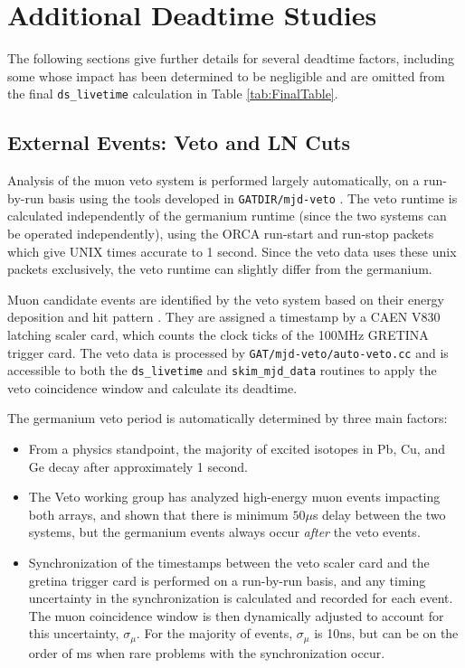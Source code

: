 \documentclass[notitlepage,rmp,aps,10pt]{revtex4-1}
\newcommand{\tty}{\texttt}
\begin{document}
\newpage
\section{Additional Deadtime Studies} \label{sec:deadtimeDetails}
The following sections give further details for several deadtime factors, including some whose impact has been determined to be negligible and are omitted from the final \tty{ds\_livetime} calculation in Table \ref{tab:FinalTable}.


\subsection{External Events: Veto and LN Cuts} \label{sec:externalEvents}

Analysis of the muon veto system is performed largely automatically, on a run-by-run basis using the tools developed in \tty{GATDIR/mjd-veto} \cite{Wiseman2015}.  The veto runtime is calculated independently of the germanium runtime (since the two systems can be operated independently), using the ORCA run-start and run-stop packets which give UNIX times accurate to 1 second.  Since the veto data uses these unix packets exclusively, the veto runtime can slightly differ from the germanium.

Muon candidate events are identified by the veto system based on their energy deposition and hit pattern \cite{Wiseman2015}.  They are assigned a timestamp by a CAEN V830 latching scaler card, which counts the clock ticks of the 100MHz GRETINA trigger card.  The veto data is processed by \tty{GAT/mjd-veto/auto-veto.cc} and is accessible to both the \tty{ds\_livetime} and \tty{skim\_mjd\_data} routines to apply the veto coincidence window and calculate its deadtime.

The germanium veto period is automatically determined by three main factors:
\begin{itemize}
  \item From a physics standpoint, the majority of excited isotopes in Pb, Cu, and Ge decay after approximately 1 second.

  \item The Veto working group has analyzed high-energy muon events impacting both arrays, and shown that there is minimum $50\mu$s delay between the two systems, but the germanium events always occur \textit{after} the veto events.

  \item Synchronization of the timestamps between the veto scaler card and the gretina trigger card is performed on a run-by-run basis, and any timing uncertainty in the synchronization is calculated and recorded for each event.  The muon coincidence window is then dynamically adjusted to account for this uncertainty, $\sigma_{\mu}$.  For the majority of events, $\sigma_{\mu}$ is 10ns, but can be on the order of ms when rare problems with the synchronization occur.
\end{itemize}
\end{document}

